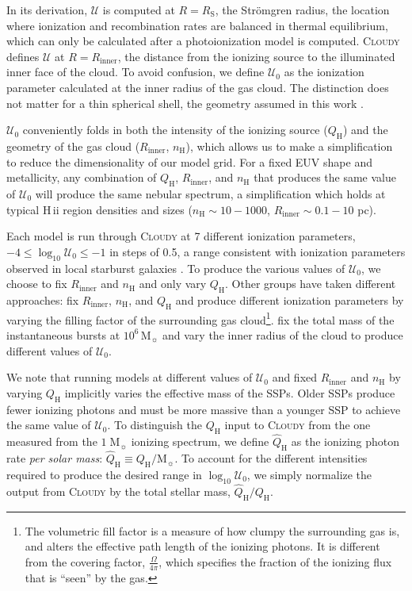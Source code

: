 \documentclass[linenumbers, tighten, trackchanges]{aastex61}%
\newcommand{\strom}{Str{\"o}mgren}
\newcommand{\Cloudy}{\textsc{Cloudy}\xspace}
\newcommand{\logten}{\ensuremath{\log_{10}}}
\newcommand\Msun{\ensuremath{\mathrm{M_{\sun}}}}
\newcommand{\hii}{H\,{\sc ii}\xspace}
\newcommand{\nH}{\ensuremath{n_{\mathrm{H}}}}
\newcommand{\Rin}{\ensuremath{R_{\mathrm{inner}}}}
\newcommand{\QH}{\ensuremath{Q_{\mathrm{H}}}}
\newcommand{\QHat}{\ensuremath{\hat{Q}_{\mathrm{H}}}}
\newcommand{\U}{\ensuremath{\mathcal{U}_{0}}}
\newcommand{\Up}{\ensuremath{\mathcal{U}}}
\newcommand{\Rs}{\ensuremath{R_{\mathrm{S}}}}
\newcommand{\logU}{\ensuremath{\logten \mathcal{U}_0}}
\begin{document}
In its derivation, \Up{} is computed at $R = \Rs$, the \strom{} radius, the location where ionization and recombination rates are balanced in thermal equilibrium, which can only be calculated after a photoionization model is computed. \Cloudy defines \Up{} at $R = \Rin$, the distance from the ionizing source to the illuminated inner face of the cloud. To avoid confusion, we define \U{} as the ionization parameter calculated at the inner radius of the gas cloud. The distinction does not matter for a thin spherical shell, the geometry assumed in this work \citep[for details see][]{CL01}.

\U{} conveniently folds in both the intensity of the ionizing source (\QH{}) and the geometry of the gas cloud (\Rin{}, \nH{}), which allows us to make a simplification to reduce the dimensionality of our model grid. For a fixed EUV shape and metallicity, any combination of \QH{}, \Rin{}, and \nH{} that produces the same value of \U{} will produce the same nebular spectrum, a simplification which holds at typical \hii region densities and sizes ($\nH{} \sim 10-1000$, $\Rin \sim 0.1-10$ pc). 

Each model is run through \Cloudy at 7 different ionization parameters, $-4 \leq \logU \leq -1$ in steps of 0.5, a range consistent with ionization parameters observed in local starburst galaxies \citep{Rigby04}. To produce the various values of \U{}, we choose to fix \Rin{} and \nH{} and only vary \QH{}. Other groups have taken different approaches: \citet{Moy01} fix \Rin{}, \nH{}, and \QH{} and produce different ionization parameters by varying the filling factor of the surrounding gas cloud\footnote{The volumetric fill factor is a measure of how clumpy the surrounding gas is, and alters the effective path length of the ionizing photons. It is different from the covering factor, $\frac{\Omega}{4\pi}$, which specifies the fraction of the ionizing flux that is ``seen'' by the gas.}. \citet{Levesque10} fix the total mass of the instantaneous bursts at $10^6\,\Msun$ and vary the inner radius of the cloud to produce different values of \U{}.

We note that running models at different values of \U{} and fixed \Rin{} and \nH{} by varying \QH{} implicitly varies the effective mass of the SSPs. Older SSPs produce fewer ionizing photons and must be more massive than a younger SSP to achieve the same value of \U{}. To distinguish the \QH{} input to \Cloudy from the one measured from the $1\;\Msun$ ionizing spectrum, we define \QHat{} as the ionizing photon rate \emph{per solar mass}: $\QHat \equiv \QH/\Msun$. To account for the different intensities required to produce the desired range in \logU{}, we simply normalize the output from \Cloudy by the total stellar mass, $\QHat/\QH$. 
\end{document}
